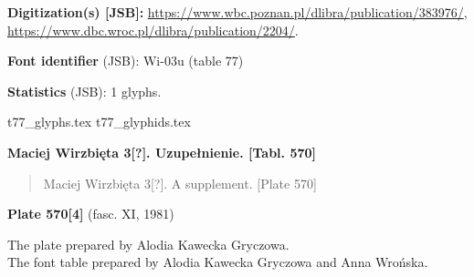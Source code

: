 \documentclass[12pt]{article}
\newcommand{\bg}{\begingl}
\newcommand{\pismoPL}[1]{{\relsize{2}\Junicode\textbf{#1}}}
\newcommand{\pismoEN}[1]{{\relsize{1}\Junicode\begin{quote}#1\end{quote}}}
\newcommand{\plate}[3]{\textbf{Plate #1} (fasc. #2, #3)}
\newcommand{\exampleBib}[1]{{\relsize{2}\Junicode\textbf{The
      example:}\\[2ex] CATALOGUS LIBRORUM \textbf{#1}}}
\newcommand{\exampleDesc}[1]{{\relsize{0}\Junicode#1}}
\newcommand{\exampleDig}[1]{{\relsize{0}\Junicode \textbf{Digitization(s) [JSB]:} #1}}
\newcommand{\exampleLib}[1]{{\relsize{0}\Junicode \textbf{Library:} #1}}
\newcommand{\fontID}[2]{{\relsize{1}\Junicode\textbf{Font identifier} (JSB): #1 (table #2)}}
\newcommand{\fontstat}[1]{{\relsize{1}\Junicode\textbf{Statistics} (JSB): #1 glyphs.}}
\newcommand{\exampleRef}[1]{{\relsize{0}\Junicode \textbf{References:} #1}}
\newcommand{\examplePage}[1]{{Page reference: \relsize{0}\Junicode#1}}
\begin{document}
\bigskip


  




  \exampleDig{\url{https://www.wbc.poznan.pl/dlibra/publication/383976/},
    \url{https://www.dbc.wroc.pl/dlibra/publication/2204/}}.

\bigskip

\fontID{Wi-03u}{77}

\fontstat{1}

  {t77_glyphs.tex}
  {t77_glyphids.tex}



 \newpage
 
% 

 

 \pismoPL{Maciej Wirzbięta 3[?]. Uzupełnienie. [Tabl. 570]}
  
 \pismoEN{Maciej Wirzbięta 3[?]. A supplement. [Plate 570]}

\plate{570[4]}{XI}{1981}

The plate prepared by Alodia Kawecka Gryczowa.\\
The font table prepared by Alodia Kawecka Gryczowa and Anna Wrońska.

\bigskip
\end{document}
